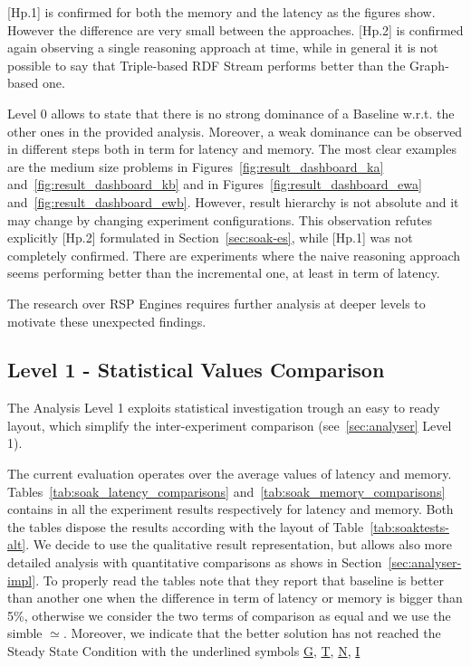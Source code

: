 [Hp.1] is confirmed for both the memory and the latency as the figures show. However the difference are very small between the approaches. [Hp.2] is confirmed again observing a single reasoning approach at time, while in general it is not possible to say that Triple-based RDF Stream performs better than the Graph-based one.

Level 0 allows to state that there is no strong dominance of a Baseline w.r.t. the other ones in the provided analysis. Moreover, a weak dominance can be observed in different steps both in term for latency  and memory. The most clear examples are the medium size problems in Figures~\ref{fig:result_dashboard_ka} and~\ref{fig:result_dashboard_kb} and in Figures~\ref{fig:result_dashboard_ewa} and~\ref{fig:result_dashboard_ewb}. However, result hierarchy is not absolute and it may change by changing experiment configurations. This observation refutes explicitly [Hp.2] formulated in Section~\ref{sec:soak-es}, while [Hp.1] was not completely confirmed. There are experiments where the naive  reasoning  approach seems performing better than the incremental one, at least in term of latency. 

The research over RSP Engines requires further analysis at deeper levels to motivate these unexpected findings.

%


\subsection{Level 1 - Statistical Values Comparison}\label{sec:eval-level1}

The Analysis Level 1 exploits statistical investigation trough an easy to ready layout, which simplify the inter-experiment comparison (see~\ref{sec:analyser} Level 1).



The current evaluation operates over the average values of latency and memory. Tables~\ref{tab:soak_latency_comparisons} and~\ref{tab:soak_memory_comparisons} contains in all the experiment results respectively for latency and memory.  Both the tables dispose the results according with the layout of Table~\ref{tab:soaktests-alt}. We decide to use the qualitative result representation, but \name allows also more detailed analysis with quantitative comparisons as shows in Section~\ref{sec:analyser-impl}. To properly read the tables note that they report that baseline is better than another one when the difference in term of latency or memory is bigger than 5\%, otherwise we consider the two terms of comparison as equal and we use the simble $\simeq$.
Moreover, we indicate that the better solution has not reached the Steady State Condition with the underlined symbols \underline{G}, \underline{T}, \underline{N}, \underline{I}

